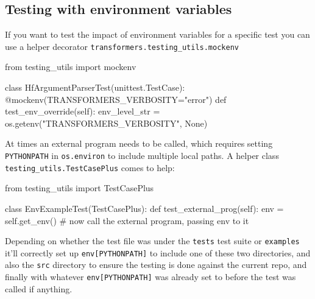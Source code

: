 \documentclass[
]{report}
\newenvironment{Shaded}{\begin{snugshade}}{\end{snugshade}}
\newcommand{\AttributeTok}[1]{\textcolor[rgb]{0.40,0.45,0.13}{#1}}
\newcommand{\CommentTok}[1]{\textcolor[rgb]{0.37,0.37,0.37}{#1}}
\newcommand{\ImportTok}[1]{\textcolor[rgb]{0.00,0.46,0.62}{#1}}
\newcommand{\KeywordTok}[1]{\textcolor[rgb]{0.00,0.23,0.31}{#1}}
\newcommand{\NormalTok}[1]{\textcolor[rgb]{0.00,0.23,0.31}{#1}}
\newcommand{\OperatorTok}[1]{\textcolor[rgb]{0.37,0.37,0.37}{#1}}
\newcommand{\StringTok}[1]{\textcolor[rgb]{0.13,0.47,0.30}{#1}}
\newcommand{\VariableTok}[1]{\textcolor[rgb]{0.07,0.07,0.07}{#1}}
\begin{document}
\subsection{Testing with environment
variables}\label{testing-with-environment-variables}

If you want to test the impact of environment variables for a specific
test you can use a helper decorator
\texttt{transformers.testing\_utils.mockenv}

\begin{Shaded}
\begin{Highlighting}[]
\ImportTok{from}\NormalTok{ testing\_utils }\ImportTok{import}\NormalTok{ mockenv}


\KeywordTok{class}\NormalTok{ HfArgumentParserTest(unittest.TestCase):}
    \AttributeTok{@mockenv}\NormalTok{(TRANSFORMERS\_VERBOSITY}\OperatorTok{=}\StringTok{"error"}\NormalTok{)}
    \KeywordTok{def}\NormalTok{ test\_env\_override(}\VariableTok{self}\NormalTok{):}
\NormalTok{        env\_level\_str }\OperatorTok{=}\NormalTok{ os.getenv(}\StringTok{"TRANSFORMERS\_VERBOSITY"}\NormalTok{, }\VariableTok{None}\NormalTok{)}
\end{Highlighting}
\end{Shaded}

At times an external program needs to be called, which requires setting
\texttt{PYTHONPATH} in \texttt{os.environ} to include multiple local
paths. A helper class \texttt{testing\_utils.TestCasePlus} comes to
help:

\begin{Shaded}
\begin{Highlighting}[]
\ImportTok{from}\NormalTok{ testing\_utils }\ImportTok{import}\NormalTok{ TestCasePlus}


\KeywordTok{class}\NormalTok{ EnvExampleTest(TestCasePlus):}
    \KeywordTok{def}\NormalTok{ test\_external\_prog(}\VariableTok{self}\NormalTok{):}
\NormalTok{        env }\OperatorTok{=} \VariableTok{self}\NormalTok{.get\_env()}
        \CommentTok{\# now call the external program, passing \textasciigrave{}env\textasciigrave{} to it}
\end{Highlighting}
\end{Shaded}

Depending on whether the test file was under the \texttt{tests} test
suite or \texttt{examples} it'll correctly set up
\texttt{env{[}PYTHONPATH{]}} to include one of these two directories,
and also the \texttt{src} directory to ensure the testing is done
against the current repo, and finally with whatever
\texttt{env{[}PYTHONPATH{]}} was already set to before the test was
called if anything.
\end{document}

